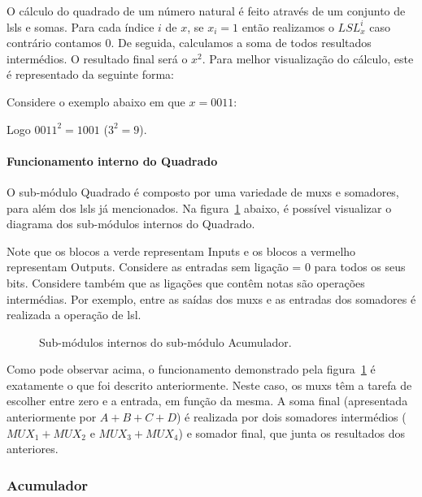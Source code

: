 O cálculo do quadrado de um número natural é feito através de um conjunto de \Glspl{lsl} e somas. Para cada índice $i$ de $x$, se $x_i = 1$ então realizamos o $LSL_x^i$ caso contrário contamos $0$. De seguida, calculamos a soma de todos resultados intermédios. O resultado final será o $x^2$. Para melhor visualização do cálculo, este é representado da seguinte forma:




Considere o exemplo abaixo em que $x = 0011$:

Logo $0011^2 = 1001$ ($3^2 = 9$).

\paragraph{Funcionamento interno do Quadrado}
O sub-módulo Quadrado é composto por uma variedade de \Glspl{mux} e somadores, para além dos \glspl{lsl} já mencionados. Na figura~\ref{fig:Quadrado_subsub} abaixo, é possível visualizar o diagrama dos sub-módulos internos do Quadrado.

\begin{infoclean}
    Note que os blocos a verde representam Inputs e os blocos a vermelho representam Outputs. Considere as entradas sem ligação = $0$ para todos os seus bits. Considere também que as ligações que contêm notas são operações intermédias. Por exemplo, entre as saídas dos \glspl{mux} e as entradas dos somadores é realizada a operação de \gls{lsl}.
\end{infoclean}

\begin{figure}[H]
    \centering
    
    \caption{Sub-módulos internos do sub-módulo Acumulador.}\label{fig:Quadrado_subsub}
\end{figure}

Como pode observar acima, o funcionamento demonstrado pela figura~\ref{fig:Quadrado_subsub} é exatamente o que foi descrito anteriormente. Neste caso, os \Glspl{mux} têm a tarefa de escolher entre zero e a entrada, em função da mesma. A soma final (apresentada anteriormente por $A+B+C+D$) é realizada por dois somadores intermédios ($MUX_1 + MUX_2$ e $MUX_3 + MUX_4$) e somador final, que junta os resultados dos anteriores.

\subsubsection{Acumulador}

